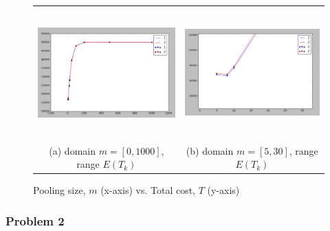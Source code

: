 \documentclass[11pt]{extarticle}
\begin{document}
\begin{enumerate}[(a)]
\begin{figure}[ht!]
\centering
\begin{tabular}{cc}
  \includegraphics[height=50mm]{P1.png} &   \includegraphics[height=50mm]{P1_2.png} \\
(a) domain $m=[0,1000]$, range $E(T_k)$ & (b) domain $m=[5,30]$, range $E(T_k)$\\[6pt]

\end{tabular}
\caption{Pooling size, $m$ (x-axis) vs. Total cost, $T$ (y-axis)}
\end{figure}


\end{enumerate}



\subsubsection*{Problem 2}


\end{document}

